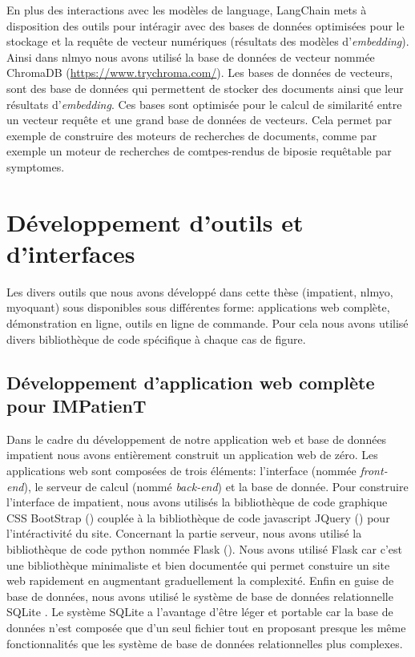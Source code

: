 En plus des interactions avec les modèles de language, LangChain mets à disposition des outils pour intéragir avec des bases de données optimisées pour le stockage et la requête de vecteur numériques (résultats des modèles d'\textit{embedding}). Ainsi dans \gls{nlmyo} nous avons utilisé la base de données de vecteur nommée ChromaDB (\href{https://www.trychroma.com/}{https://www.trychroma.com/}). Les bases de données de vecteurs, sont des base de données qui permettent de stocker des documents ainsi que leur résultats d'\textit{embedding}. Ces bases sont optimisée pour le calcul de similarité entre un vecteur requête et une grand base de données de vecteurs. Cela permet par exemple de construire des moteurs de recherches de documents, comme par exemple un moteur de recherches de comtpes-rendus de biposie requêtable par symptomes.

\section{Développement d'outils et d'interfaces}
Les divers outils que nous avons développé dans cette thèse (\gls{impatient}, \gls{nlmyo}, \gls{myoquant}) sous disponibles sous différentes forme: applications web complète, démonstration en ligne, outils en ligne de commande.  Pour cela nous avons utilisé divers bibliothèque de code spécifique à chaque cas de figure.

\subsection{Développement d'application web complète pour IMPatienT}
Dans le cadre du développement de notre application web et base de données \gls{impatient} nous avons entièrement construit un application web de zéro. Les applications web sont composées de trois éléments: l'interface (nommée \textit{front-end}), le serveur de calcul (nommé \textit{back-end}) et la base de donnée. Pour construire l'interface de \gls{impatient}, nous avons utilisés la bibliothèque de code graphique CSS BootStrap (\cite{mark_otto_bootstrap_2011}) couplée à la bibliothèque de code javascript JQuery (\cite{resig_jquery_2006}) pour l'intéractivité du site. Concernant la partie serveur, nous avons utilisé la bibliothèque de code python nommée Flask (\cite{ronacher_flask_2010}).  Nous avons utilisé Flask car c'est une bibliothèque minimaliste et bien documentée qui permet constuire un site web rapidement en augmentant graduellement la complexité. Enfin en guise de base de données, nous avons utilisé le système de base de données relationnelle SQLite \cite{hipp_sqlite_2020}. Le système SQLite a l'avantage d'être léger et portable car la base de données n'est composée que d'un seul fichier tout en proposant presque les même fonctionnalités que les système de base de données relationnelles plus complexes.

